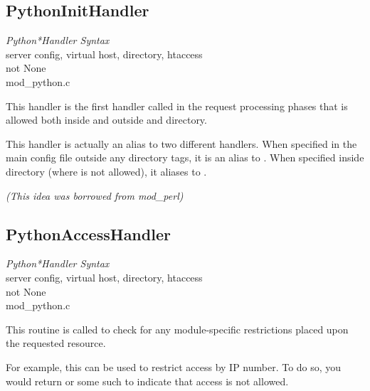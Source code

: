\subsection{PythonInitHandler\label{dir-handlers-pih}}

\emph{Python*Handler Syntax}\\
server config, virtual host, directory, htaccess\\
not None\\
mod_python.c

This handler is the first handler called in the request processing
phases that is allowed both inside and outside  and
directory.

This handler is actually an alias to two different handlers. When
specified in the main config file outside any directory tags, it is an
alias to . When specified inside directory
(where  is not allowed), it aliases to
.

\emph{(This idea was borrowed from mod_perl)}

\subsection{PythonAccessHandler\label{dir-handlers-ach}}

\emph{Python*Handler Syntax}\\
server config, virtual host, directory, htaccess\\
not None\\
mod_python.c

This routine is called to check for any module-specific restrictions
placed upon the requested resource.

For example, this can be used to restrict access by IP number. To do
so, you would return  or some such to indicate
that access is not allowed.

